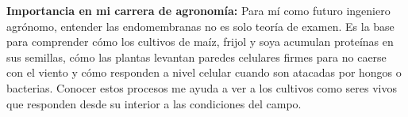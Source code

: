 \documentclass[12pt,spanish,letterpaper,oneside]{article}
\begin{document}
\textbf{Importancia en mi carrera de agronomía:} Para mí como futuro ingeniero agrónomo, entender las endomembranas no es solo teoría de examen. Es la base para comprender cómo los cultivos de maíz, frijol y soya acumulan proteínas en sus semillas, cómo las plantas levantan paredes celulares firmes para no caerse con el viento y cómo responden a nivel celular cuando son atacadas por hongos o bacterias. Conocer estos procesos me ayuda a ver a los cultivos como seres vivos que responden desde su interior a las condiciones del campo.

\vspace{0.6cm}
\printbibliography[heading=bibintoc,title={Referencias Bibliográficas}]
\end{document}
